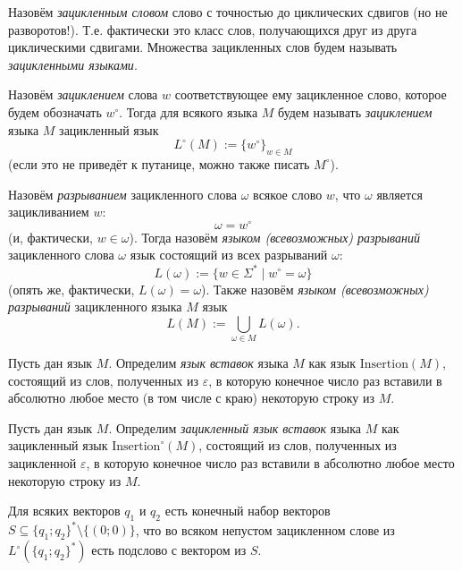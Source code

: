 \documentclass[12pt,a4paper]{article}
\newcommand{\Insertion}{\mathrm{Insertion}}
\newcommand{\Insertioncirc}{\mathrm{Insertion}^\circ}
\begin{document}
\begin{problem}{8}
\begin{enumerate}
                \begin{definition}
                    Назовём \emph{зацикленным словом} слово с точностью до циклических сдвигов (но не разворотов!). Т.е. фактически это класс слов, получающихся друг из друга циклическими сдвигами. Множества зацикленных слов будем называть \emph{зацикленными языками}.

                    Назовём \emph{зациклением} слова $w$ соответствующее ему зацикленное слово, которое будем обозначать $w^\circ$. Тогда для всякого языка $M$ будем называть \emph{зациклением} языка $M$ зацикленный язык
                    \[L^\circ(M) := \{w^\circ\}_{w \in M}\]
                    (если это не приведёт к путанице, можно также писать $M^\circ$).

                    Назовём \emph{разрыванием} зацикленного слова $\omega$ всякое слово $w$, что $\omega$ является зацикливанием $w$:
                    \[\omega = w^\circ\]
                    (и, фактически, $w \in \omega$). Тогда назовём \emph{языком (всевозможных) разрываний} зацикленного слова $\omega$ язык состоящий из всех разрываний $\omega$:
                    \[L(\omega) := \{w \in \Sigma^* \mid w^\circ = \omega\}\]
                    (опять же, фактически, $L(\omega) = \omega$). Также назовём \emph{языком (всевозможных) разрываний} зацикленного языка $M$ язык
                    \[L(M) := \bigcup_{\omega \in M} L(\omega).\]
                \end{definition}

                \begin{definition}
                    Пусть дан язык $M$. Определим \emph{язык вставок} языка $M$ как язык $\Insertion(M)$, состоящий из слов, полученных из $\varepsilon$, в которую конечное число раз вставили в абсолютно любое место (в том числе с краю) некоторую строку из $M$.
                    
                    Пусть дан язык $M$. Определим \emph{зацикленный язык вставок} языка $M$ как зацикленный язык $\Insertioncirc(M)$, состоящий из слов, полученных из зацикленной $\varepsilon$, в которую конечное число раз вставили в абсолютно любое место некоторую строку из $M$.
                \end{definition}

                \begin{lemma}
                    Для всяких векторов $q_1$ и $q_2$ есть конечный набор векторов $S \subseteq \{q_1; q_2\}^* \setminus \{(0; 0)\}$, что во всяком непустом зацикленном слове из $L^\circ(\{q_1; q_2\}^*)$ есть подслово с вектором из $S$.
                \end{lemma}


\end{enumerate}
\end{problem}
\end{document}
